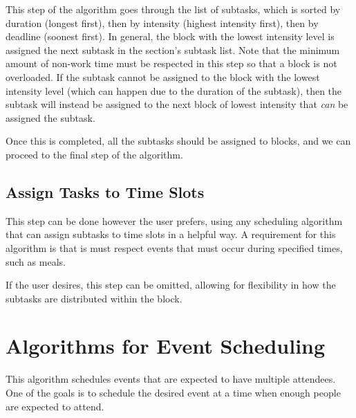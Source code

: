 \documentclass{article}
\begin{document}
		This step of the algorithm goes through the list of subtasks, which is sorted by duration (longest first), then by intensity (highest intensity first), then by deadline (soonest first).
		In general, the block with the lowest intensity level is assigned the next subtask in the section's subtask list.
		Note that the minimum amount of non-work time must be respected in this step so that a block is not overloaded.
		If the subtask cannot be assigned to the block with the lowest intensity level (which can happen due to the duration of the subtask), then the subtask will instead be assigned to the next block of lowest intensity that \emph{can} be assigned the subtask.
		
		Once this is completed, all the subtasks should be assigned to blocks, and we can proceed to the final step of the algorithm.
		
	\subsection{Assign Tasks to Time Slots}
		This step can be done however the user prefers, using any scheduling algorithm that can assign subtasks to time slots in a helpful way.
		A requirement for this algorithm is that is must respect events that must occur during specified times, such as meals.
		
		If the user desires, this step can be omitted, allowing for flexibility in how the subtasks are distributed within the block.
		
		
		
\section{Algorithms for Event Scheduling}
	This algorithm schedules events that are expected to have multiple attendees.
	One of the goals is to schedule the desired event at a time when enough people are expected to attend.
\end{document}
